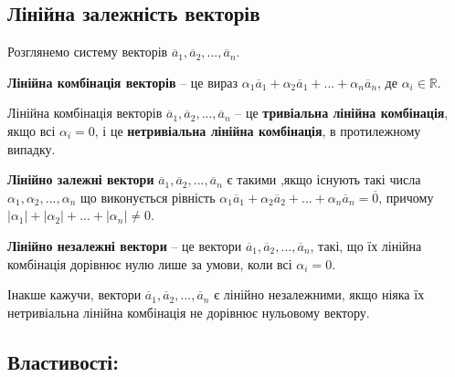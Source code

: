 \subsection{Лінійна залежність векторів}

Розглянемо систему векторів $\overline{a}_1, \overline{a}_2, ..., \overline{a}_n$.

\begin{definition}
	\textbf{Лінійна комбінація векторів} -- це вираз $\alpha_1\overline{a}_1 + \alpha_2\overline{a}_1 + ... + \alpha_n\overline{a}_n$, де $\alpha_i \in \mathbb{R}$.
\end{definition}


\begin{definition}
	Лінійна комбінація векторів $\overline{a}_1, \overline{a}_2, ..., \overline{a}_n$ -- це
	\textbf{тривіальна лінійна комбінація}, якщо всі $\alpha_i = 0$,
	і це \textbf{нетривіальна лінійна комбінація}, в протилежному випадку.
\end{definition}

\begin{definition}
	\textbf{Лінійно залежні вектори} $\overline{a}_1, \overline{a}_2, ...,\overline{a}_n$ є такими ,якщо існують
	такі числа $\alpha_1, \alpha_2, ..., \alpha_n$
	що виконується рівність $\alpha_1\overline{a}_1 + \alpha_2\overline{a}_2 + ... + \alpha_n\overline{a}_n = \overline{0}$,
	причому $|\alpha_1| + |\alpha_2| + ... + |\alpha_n| \neq 0$.
\end{definition}

\begin{definition}
	\textbf{Лінійно незалежні вектори} -- це вектори $\overline{a}_1, \overline{a}_2, ..., \overline{a}_n$, такі, що їх лінійна
	комбінація дорівнює нулю лише за умови, коли всі $\alpha_i = 0$.
\end{definition}

Інакше кажучи, вектори $\overline{a}_1, \overline{a}_2, ..., \overline{a}_n$ є лінійно незалежними, якщо ніяка їх
нетривіальна лінійна комбінація не дорівнює нульовому вектору. 

\subsection*{Властивості:}

